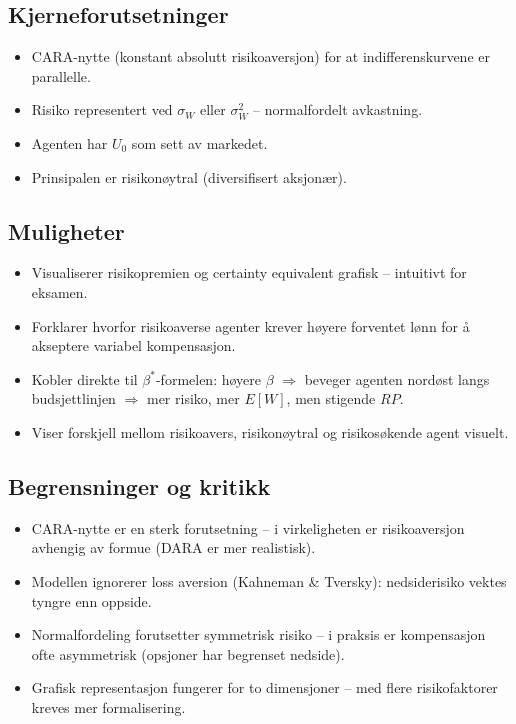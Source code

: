 \subsection*{Kjerneforutsetninger}
\begin{itemize}
\item CARA-nytte (konstant absolutt risikoaversjon) for at indifferenskurvene er parallelle.
\item Risiko representert ved $\sigma_W$ eller $\sigma^2_W$ -- normalfordelt avkastning.
\item Agenten har  $U_0$ som sett av markedet.
\item Prinsipalen er risikonøytral (diversifisert aksjonær).
\end{itemize}

\subsection*{Muligheter}
\begin{itemize}
\item Visualiserer risikopremien og certainty equivalent grafisk -- intuitivt for eksamen.
\item Forklarer hvorfor risikoaverse agenter krever høyere forventet lønn for å akseptere variabel kompensasjon.
\item Kobler direkte til $\beta^*$-formelen: høyere $\beta$ $\Rightarrow$ beveger agenten nordøst langs budsjettlinjen $\Rightarrow$ mer risiko, mer $E[W]$, men stigende $RP$.
\item Viser forskjell mellom risikoavers, risikonøytral og risikosøkende agent visuelt.
\end{itemize}

\subsection*{Begrensninger og kritikk}
\begin{itemize}
\item CARA-nytte er en sterk forutsetning -- i virkeligheten er risikoaversjon avhengig av formue (DARA er mer realistisk).
\item Modellen ignorerer loss aversion (Kahneman \& Tversky): nedsiderisiko vektes tyngre enn oppside.
\item Normalfordeling forutsetter symmetrisk risiko -- i praksis er kompensasjon ofte asymmetrisk (opsjoner har begrenset nedside).
\item Grafisk representasjon fungerer for to dimensjoner -- med flere risikofaktorer kreves mer formalisering.
\end{itemize}

